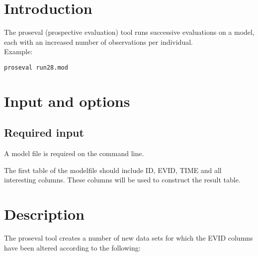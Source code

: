 

\newcommand{\guidetoolname}{proseval}



\maketitle


\section{Introduction}
The proseval (prospective evaluation) tool runs successive evaluations on a model, each with an increased number of observations per individual.\\
Example:
\begin{verbatim}
proseval run28.mod
\end{verbatim}

\section{Input and options}

\subsection{Required input}
A model file is required on the command line.

The first table of the modelfile should include ID, EVID, TIME and all interesting columns. These columns will be used to
construct the result table.


\section{Description}
The proseval tool creates a number of new data sets for which the EVID columns have been altered according to the following:

